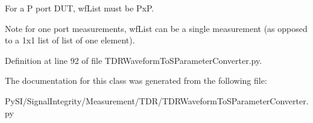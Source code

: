 For a P port D\+UT, wf\+List must be PxP. \begin{DoxyNote}{Note}
for one port measurements, wf\+List can be a single measurement (as opposed to a 1x1 list of list of one element). 
\end{DoxyNote}


Definition at line 92 of file T\+D\+R\+Waveform\+To\+S\+Parameter\+Converter.\+py.



The documentation for this class was generated from the following file\+:\begin{DoxyCompactItemize}
\item 
Py\+S\+I/\+Signal\+Integrity/\+Measurement/\+T\+D\+R/T\+D\+R\+Waveform\+To\+S\+Parameter\+Converter.\+py\end{DoxyCompactItemize}

